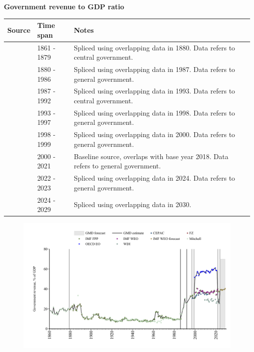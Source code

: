 \documentclass[12pt,a4paper,landscape]{article}
\begin{document}
\begin{adjustbox}{max totalsize={\paperwidth}{\paperheight},center}
\begin{minipage}[t][\textheight][t]{\textwidth}
\vspace*{0.5cm}
{}
\begin{center}
{\Large\bfseries Government revenue to GDP ratio}
\end{center}
\vspace{0.5cm}
\begin{table}[H]
\centering
\small
\begin{tabular}{|l|l|l|}
\hline
\textbf{Source} & \textbf{Time span} & \textbf{Notes} \\
\hline
\rowcolor{white}\cite{Mitchell}& 1861 - 1879 &Spliced using overlapping data in 1880. Data refers to central government.\\
\rowcolor{lightgray}\cite{IMF_FPP}& 1880 - 1986 &Spliced using overlapping data in 1987. Data refers to general government.\\
\rowcolor{white}\cite{Mitchell}& 1987 - 1992 &Spliced using overlapping data in 1993. Data refers to central government.\\
\rowcolor{lightgray}\cite{IMF_FPP}& 1993 - 1997 &Spliced using overlapping data in 1998. Data refers to general government.\\
\rowcolor{white}\cite{CEPAC}& 1998 - 1999 &Spliced using overlapping data in 2000. Data refers to general government.\\
\rowcolor{lightgray}\cite{OECD_EO}& 2000 - 2021 &Baseline source, overlaps with base year 2018. Data refers to general government.\\
\rowcolor{white}\cite{WDI}& 2022 - 2023 &Spliced using overlapping data in 2024. Data refers to general government.\\
\rowcolor{lightgray}\cite{IMF_WEO_forecast}& 2024 - 2029 &Spliced using overlapping data in 2030. \\
\hline
\end{tabular}
\end{table}
\begin{figure}[H]
\centering
\includegraphics[width=\textwidth,height=0.6\textheight,keepaspectratio]{graphs/BRA_govrev_GDP.pdf}
\end{figure}
\end{minipage}
\end{adjustbox}
\end{document}
